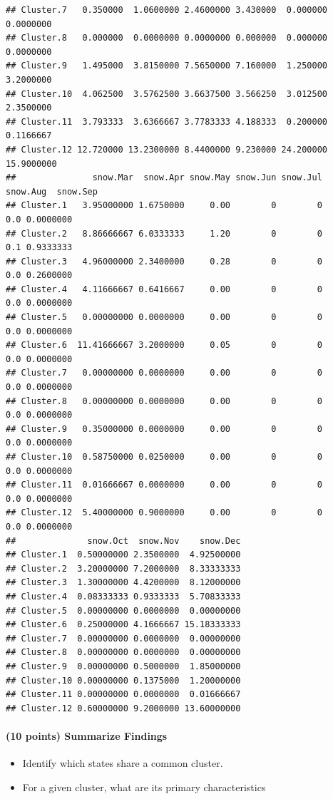 \documentclass[
]{article}
\providecommand{\tightlist}{%
  \setlength{\itemsep}{0pt}\setlength{\parskip}{0pt}}
\begin{document}
\begin{verbatim}
## Cluster.7   0.350000  1.0600000 2.4600000 3.430000  0.000000  0.0000000
## Cluster.8   0.000000  0.0000000 0.0000000 0.000000  0.000000  0.0000000
## Cluster.9   1.495000  3.8150000 7.5650000 7.160000  1.250000  3.2000000
## Cluster.10  4.062500  3.5762500 3.6637500 3.566250  3.012500  2.3500000
## Cluster.11  3.793333  3.6366667 3.7783333 4.188333  0.200000  0.1166667
## Cluster.12 12.720000 13.2300000 8.4400000 9.230000 24.200000 15.9000000
##               snow.Mar  snow.Apr snow.May snow.Jun snow.Jul snow.Aug  snow.Sep
## Cluster.1   3.95000000 1.6750000     0.00        0        0      0.0 0.0000000
## Cluster.2   8.86666667 6.0333333     1.20        0        0      0.1 0.9333333
## Cluster.3   4.96000000 2.3400000     0.28        0        0      0.0 0.2600000
## Cluster.4   4.11666667 0.6416667     0.00        0        0      0.0 0.0000000
## Cluster.5   0.00000000 0.0000000     0.00        0        0      0.0 0.0000000
## Cluster.6  11.41666667 3.2000000     0.05        0        0      0.0 0.0000000
## Cluster.7   0.00000000 0.0000000     0.00        0        0      0.0 0.0000000
## Cluster.8   0.00000000 0.0000000     0.00        0        0      0.0 0.0000000
## Cluster.9   0.35000000 0.0000000     0.00        0        0      0.0 0.0000000
## Cluster.10  0.58750000 0.0250000     0.00        0        0      0.0 0.0000000
## Cluster.11  0.01666667 0.0000000     0.00        0        0      0.0 0.0000000
## Cluster.12  5.40000000 0.9000000     0.00        0        0      0.0 0.0000000
##              snow.Oct  snow.Nov    snow.Dec
## Cluster.1  0.50000000 2.3500000  4.92500000
## Cluster.2  3.20000000 7.2000000  8.33333333
## Cluster.3  1.30000000 4.4200000  8.12000000
## Cluster.4  0.08333333 0.9333333  5.70833333
## Cluster.5  0.00000000 0.0000000  0.00000000
## Cluster.6  0.25000000 4.1666667 15.18333333
## Cluster.7  0.00000000 0.0000000  0.00000000
## Cluster.8  0.00000000 0.0000000  0.00000000
## Cluster.9  0.00000000 0.5000000  1.85000000
## Cluster.10 0.00000000 0.1375000  1.20000000
## Cluster.11 0.00000000 0.0000000  0.01666667
## Cluster.12 0.60000000 9.2000000 13.60000000
\end{verbatim}

\hypertarget{points-summarize-findings}{%
\paragraph{(10 points) Summarize
Findings}\label{points-summarize-findings}}

\begin{itemize}
\tightlist
\item
  Identify which states share a common cluster.
\item
  For a given cluster, what are its primary characteristics
\end{itemize}
\end{document}
